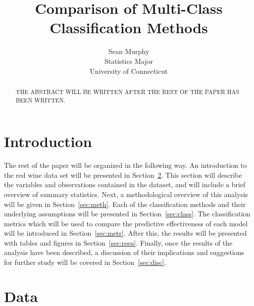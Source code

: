\documentclass[12pt]{article}
\title{Comparison of Multi-Class Classification Methods}
\author{Sean Murphy\\
  Statistics Major\\
  University of Connecticut
}
\begin{document}
\maketitle

\begin{abstract}
THE ABSTRACT WILL BE WRITTEN AFTER THE REST OF THE PAPER HAS BEEN WRITTEN. 
\end{abstract}


\section{Introduction}
\label{sec:intro}





The rest of the paper will be organized in the following way.  
An introduction to the red wine data set will be presented in 
Section~\ref{sec:data}.  This section will describe the variables 
and observations contained in the dataset, and will include a brief 
overview of summary statistics.  Next, a methodological overview of 
this analysis will be given in Section~\ref{sec:meth}.  Each of the 
classification methods and their underlying assumptions will be 
presented in Section~\ref{sec:class}.  The classification metrics 
which will be used to compare the predictive effectiveness of each 
model will be introduced in Section~\ref{sec:metr}.  After this, 
the results will be presented with tables and figures in 
Section~\ref{sec:resu}.  Finally, once the results of the analysis 
have been described, a discussion of their implications and suggestions 
for further study will be covered in Section~\ref{sec:disc}.


\section{Data}
\label{sec:data}
\end{document}
